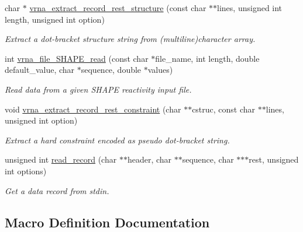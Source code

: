 \begin{DoxyCompactItemize}
char $\ast$ \hyperlink{group__file__formats_gad37cbb63a05eed63ba25c91628409be0}{vrna\+\_\+extract\+\_\+record\+\_\+rest\+\_\+structure} (const char $\ast$$\ast$lines, unsigned int length, unsigned int option)
\begin{DoxyCompactList}\small\item\em Extract a dot-\/bracket structure string from (multiline)character array. \end{DoxyCompactList}\item 
int \hyperlink{group__file__formats_ga646ebf45450a69a7f2533f9ecd283a32}{vrna\+\_\+file\+\_\+\+S\+H\+A\+P\+E\+\_\+read} (const char $\ast$file\+\_\+name, int length, double default\+\_\+value, char $\ast$sequence, double $\ast$values)
\begin{DoxyCompactList}\small\item\em Read data from a given S\+H\+A\+PE reactivity input file. \end{DoxyCompactList}\item 
void \hyperlink{group__file__formats_ga55a9ae6dfeecc1b3f0c2acf6fa796c15}{vrna\+\_\+extract\+\_\+record\+\_\+rest\+\_\+constraint} (char $\ast$$\ast$cstruc, const char $\ast$$\ast$lines, unsigned int option)
\begin{DoxyCompactList}\small\item\em Extract a hard constraint encoded as pseudo dot-\/bracket string. \end{DoxyCompactList}\item 
unsigned int \hyperlink{group__file__formats_gafd194a69af9d92b5b0412a7627ac1595}{read\+\_\+record} (char $\ast$$\ast$header, char $\ast$$\ast$sequence, char $\ast$$\ast$$\ast$rest, unsigned int options)
\begin{DoxyCompactList}\small\item\em Get a data record from stdin. \end{DoxyCompactList}\end{DoxyCompactItemize}


\subsection{Macro Definition Documentation}
\mbox{\label{group__file__formats_gabec89c09874528c6cb73140a4c3d86d7}} 
